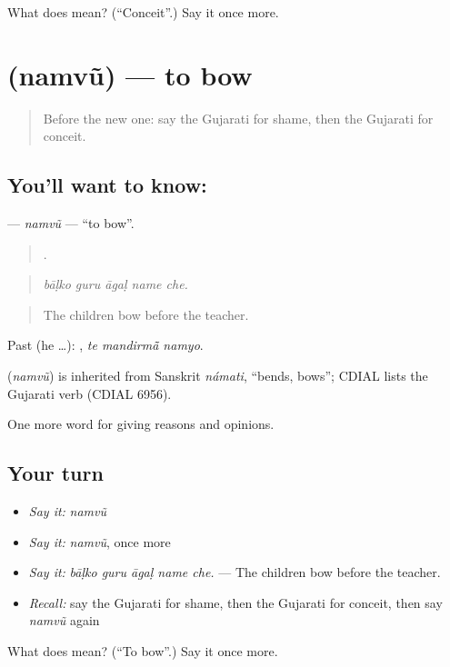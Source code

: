 \begin{tcolorbox}[breakable,colback=teal!4,colframe=teal!35!black,title={Before you move on}]
What does  mean? (\textquotedblleft{}Conceit\textquotedblright{}.) Say it once more.
\end{tcolorbox}
\section[\texorpdfstring{\gu{નમવું} (namvũ)}{નમવું (namvũ)}]{ (namvũ) — to bow}

\label{lesson:GU-C359-namvu}



\begin{quote}
Before the new one: say the Gujarati for shame, then the Gujarati for conceit.
\end{quote}

\subsection*{You'll want to know: }
\textbf{} — \emph{namvũ} — \textquotedblleft{}to bow\textquotedblright{}.

\begin{quote}
    .
\end{quote}

\begin{quote}
\emph{bāḷko guru āgaḷ name che.}
\end{quote}

\begin{quote}
The children bow before the teacher.
\end{quote}

Past (he …):   , \emph{te mandirmā̃ namyo}.

\begin{cousinweb}
\textbf{} (\emph{namvũ}) is inherited from Sanskrit \emph{námati}, \textquotedblleft{}bends, bows\textquotedblright{}; CDIAL lists the Gujarati verb (CDIAL 6956).
\end{cousinweb}

\begin{grammarlens}[title={What you've built}]
One more word for giving reasons and opinions.
\end{grammarlens}

\subsection*{Your turn}
\begin{itemize}
\raggedright
  \item \emph{Say it:} \emph{namvũ}
  \item \emph{Say it:} \emph{namvũ}, once more
  \item \emph{Say it:} \emph{bāḷko guru āgaḷ name che.} — The children bow before the teacher.
  \item \emph{Recall:} say the Gujarati for shame, then the Gujarati for conceit, then say \emph{namvũ} again
\end{itemize}

\begin{tcolorbox}[breakable,colback=teal!4,colframe=teal!35!black,title={Before you move on}]
What does  mean? (\textquotedblleft{}To bow\textquotedblright{}.) Say it once more.
\end{tcolorbox}

